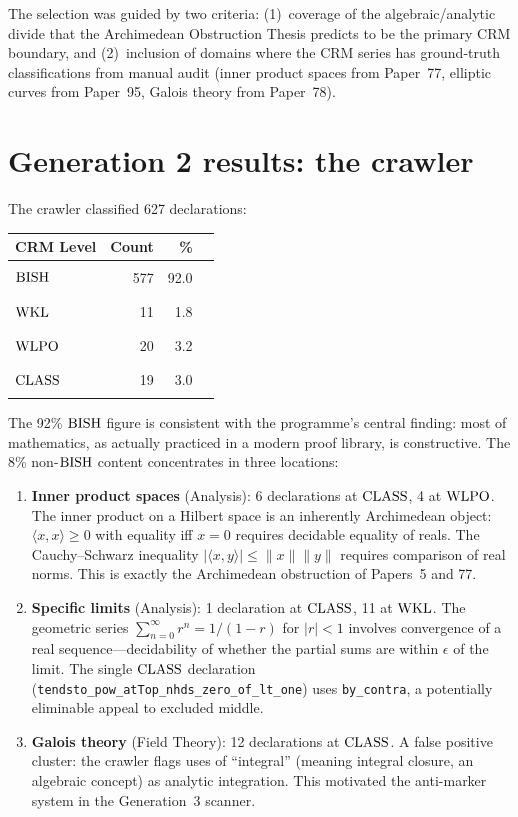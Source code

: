 \documentclass[11pt,a4paper]{article}
\theoremstyle{plain}
\theoremstyle{definition}
\newcommand{\BISH}{\textup{BISH}}
\newcommand{\WKL}{\textup{WKL}}
\newcommand{\WLPO}{\textup{WLPO}}
\newcommand{\CLASS}{\textup{CLASS}}
\begin{document}
The selection was guided by two criteria: (1)~coverage of the
algebraic/analytic divide that the Archimedean Obstruction Thesis
predicts to be the primary CRM boundary, and (2)~inclusion of domains
where the CRM series has ground-truth classifications from manual
audit (inner product spaces from Paper~77, elliptic curves from
Paper~95, Galois theory from Paper~78).

\section{Generation 2 results: the crawler}\label{sec:crawler-results}

The crawler classified 627 declarations:

\begin{center}
\begin{tabular}{lrrl}
\toprule
\textbf{CRM Level} & \textbf{Count} & \textbf{\%} & \\
\midrule
$\BISH$  & 577 & 92.0 & \rule{4.6cm}{6pt} \\
$\WKL$   &  11 &  1.8 & \rule{0.09cm}{6pt} \\
$\WLPO$  &  20 &  3.2 & \rule{0.16cm}{6pt} \\
$\CLASS$ &  19 &  3.0 & \rule{0.15cm}{6pt} \\
\bottomrule
\end{tabular}
\end{center}

The 92\% $\BISH$ figure is consistent with the programme's central
finding: most of mathematics, as actually practiced in a modern proof
library, is constructive.  The 8\% non-$\BISH$ content concentrates
in three locations:

\begin{enumerate}[label=(\roman*)]
\item \textbf{Inner product spaces} (Analysis):
  6 declarations at $\CLASS$, 4 at $\WLPO$.
  The inner product on a Hilbert space is an inherently Archimedean
  object: $\langle x, x \rangle \geq 0$ with equality iff $x = 0$
  requires decidable equality of reals.  The Cauchy--Schwarz inequality
  $|\langle x, y \rangle| \leq \|x\| \|y\|$ requires comparison of
  real norms.  This is exactly the Archimedean obstruction of Papers~5
  and 77.

\item \textbf{Specific limits} (Analysis):
  1 declaration at $\CLASS$, 11 at $\WKL$.
  The geometric series $\sum_{n=0}^\infty r^n = 1/(1-r)$ for $|r|<1$
  involves convergence of a real sequence---decidability of whether the
  partial sums are within $\epsilon$ of the limit.  The single $\CLASS$
  declaration (\texttt{tendsto\_pow\_atTop\_nhds\_zero\_of\_lt\_one})
  uses \texttt{by\_contra}, a potentially eliminable appeal to
  excluded middle.

\item \textbf{Galois theory} (Field Theory):
  12 declarations at $\CLASS$.
  A false positive cluster: the crawler flags uses of ``integral''
  (meaning integral closure, an algebraic concept) as analytic
  integration.  This motivated the anti-marker system in the
  Generation~3 scanner.
\end{enumerate}
\end{document}
